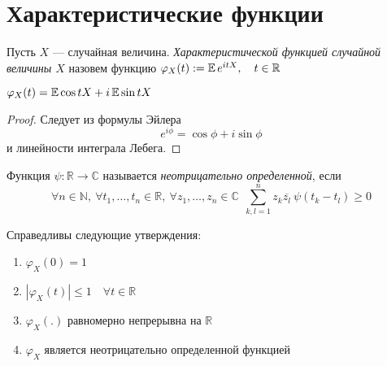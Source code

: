 
    \section{Характеристические функции}
        \begin{definition}\label{lect11:def1}
            Пусть $X$ --- случайная величина. \emph{Характеристической функцией случайной величины $X$} назовем функцию $\varphi_X(t):=\operatorname*{\mathbb{E}} e^{itX}, \quad t\in\mathbb{R}$
        \end{definition}
        \begin{prop}\label{lect11:prop1}
            $\varphi_X(t) = \operatorname*{\mathbb{E}}\cos tX +i\operatorname*{\mathbb{E}}\sin tX$
        \end{prop}
        \begin{proof}
            Следует из формулы Эйлера \begin{equation*}
                e^{i \phi}=\cos\phi + i\sin\phi
            \end{equation*}и линейности интеграла Лебега.
        \end{proof}
        \begin{definition}\label{lect11:def2}
            Функция $\psi:\mathbb{R} \rightarrow \mathbb{C}$ называется \emph{неотрицательно определенной}, если
            \begin{equation*}
                \forall n\in\mathbb{N}, \ \forall t_1, \dots, t_n\in\mathbb{R},\ \forall z_1, \dots, z_n \in \mathbb{C} \ \ \sum_{k, l = 1}^{n} z_k \overline{z_l} \ \psi(t_k-t_l) \geq 0
            \end{equation*}
        \end{definition}
        \begin{theorem} \label{lect11:th1}
            Справедливы следующие утверждения:

            \begin{enumerate}
                \item $\varphi_X(0)=1$
                \item $\left|\varphi_X(t)\right| \leq 1 \quad \forall t\in\mathbb{R}$
                \item $\varphi_X(.)$ равномерно непрерывна на $\mathbb{R}$
                \item $\varphi_X$ является неотрицательно определенной функцией 
            \end{enumerate}
        \end{theorem}
